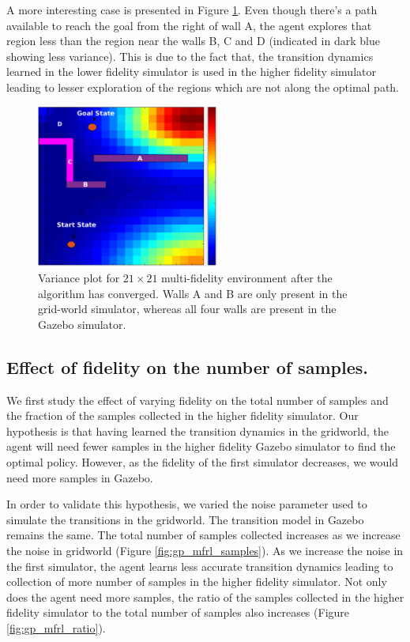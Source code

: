\documentclass[12pt]{report}
\begin{document}
A more interesting case is presented in Figure \ref{fig:heatmap_four_walls_complex}. Even though there's a path available to reach the goal from the right of wall A, the agent explores that region less than the region near the walls B, C and D (indicated in dark blue showing less variance). This is due to the fact that, the transition dynamics learned in the lower fidelity simulator is used in the higher fidelity simulator leading to lesser exploration of the regions which are not along the optimal path.
\begin{figure}[htp]
	\centering 
	\includegraphics[width=6cm]{heatmap_new.eps}
	\caption{Variance plot for $21 \times 21$ multi-fidelity environment after the algorithm has converged. Walls A and B are only present in the grid-world simulator, whereas all four walls are present in the Gazebo simulator.}
   \label{fig:heatmap_four_walls_complex}
\end{figure}


\subsection{Effect of fidelity on the number of samples.}

We first study the effect of varying fidelity on the total number of samples and the fraction of the samples collected in the higher fidelity simulator. Our hypothesis is that having learned the transition dynamics in the gridworld, the agent will need fewer samples in the higher fidelity Gazebo simulator to find the optimal policy. However, as the fidelity of the first simulator decreases, we would need more samples in Gazebo. 

In order to validate this hypothesis, we varied the noise parameter used to simulate the transitions in the gridworld. The transition model in Gazebo remains the same. The total number of samples collected increases as we increase the noise in gridworld (Figure \ref{fig:gp_mfrl_samples}). As we increase the noise in the first simulator, the agent learns less accurate transition dynamics leading to collection of more number of samples in the higher fidelity simulator. Not only does the agent need more samples, the ratio of the samples collected in the higher fidelity simulator to the total number of samples also increases (Figure \ref{fig:gp_mfrl_ratio}). 
\end{document}
